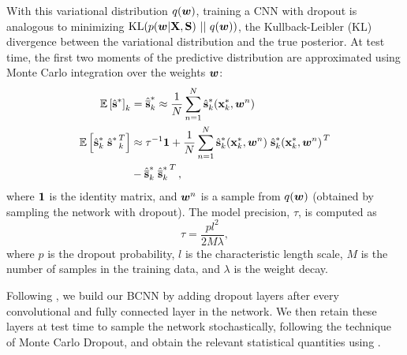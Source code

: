 With this variational distribution $q(\boldsymbol{w})$, training a CNN with dropout is analogous to minimizing $\text{KL}(p(\boldsymbol{w} | \boldsymbol{\mathbf{X}}, \boldsymbol{\mathbf{S}})~||~q(\boldsymbol{w}))$, the Kullback-Leibler (KL) divergence  between the variational distribution and the true posterior.
At test time, the first two moments of the predictive distribution are approximated using Monte Carlo integration over the weights $\boldsymbol{w}$:
\begin{align}
\label{eq:sun_direction_mean}
\mathbb{E}\left[{\hat{\boldsymbol{\mathbf{s}}}}^*\right]_k &= {\hat{\overline{\boldsymbol{\mathbf{s}}}}}^*_k \approx \frac{1}{N} \sum_{n=1}^N {\hat{\boldsymbol{\mathbf{s}}}}^*_k ({\boldsymbol{\mathbf{x}}}^*_k, \boldsymbol{w}^n) \\
\mathbb{E}\left[{\hat{\boldsymbol{\mathbf{s}}}_k}^* \left.{{\hat{\boldsymbol{\mathbf{s}}}}^*}\right.^T_k\right] &\approx \tau^{-1} \boldsymbol{\mathbf{1}} 
 +  \frac{1}{N} \sum_{n=1}^N {\hat{\boldsymbol{\mathbf{s}}}}^*_k({\boldsymbol{\mathbf{x}}}^*_k, \boldsymbol{w}^n) \left.{{\hat{\boldsymbol{\mathbf{s}}}_k}^*({\boldsymbol{\mathbf{x}}}^*_k, \boldsymbol{w}^n)}\right.^T \notag \\ 
 &- {\hat{\overline{\boldsymbol{\mathbf{s}}}}}^*_k \left.{{\hat{\overline{\boldsymbol{\mathbf{s}}}}}^*_k}\right.^T,
 \label{eq:bcnn_covar}
\end{align}
where $\boldsymbol{\mathbf{1}}$ is the identity matrix, and $\boldsymbol{w}^n$ is a sample from $q(\boldsymbol{w})$ (obtained by sampling the network with dropout). The model precision, $\tau$, is computed as
\begin{equation}
	\label{eq:model_precision}
	\tau = \frac{p l^2}{2 M \lambda}, 
\end{equation} 
where $p$ is the dropout probability, $l$ is the characteristic length scale, $M$ is the number of samples in the training data, and $\lambda$ is the weight decay. 

Following \citet{Gal2016CNN}, we build our BCNN by adding dropout layers after every convolutional and fully connected layer in the network. 
We then retain these layers at test time to sample the network stochastically, following the technique of Monte Carlo Dropout, and obtain the relevant statistical quantities using . 

